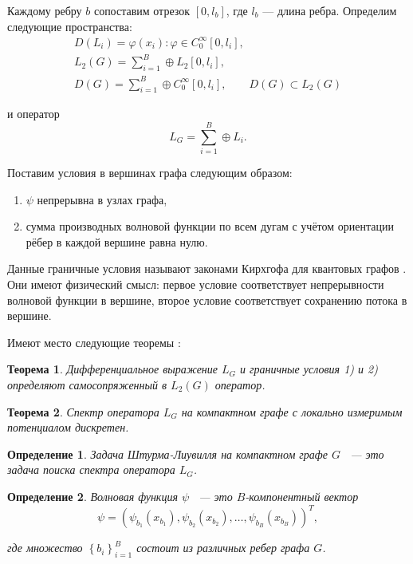 \documentclass[a4 paper, 12 pt]{extarticle}
\newtheorem{theorem}{Теорема}[section]
\newtheorem{Def}{Определение}[section]
\begin{document}
   Каждому ребру $b$ сопоставим отрезок $[0, l_b]$, где $l_b$ --- длина ребра.
   Определим следующие пространства:
   \begin{gather*}
   D(L_i)={\varphi(x_i):\varphi\in C_0^\infty[0,l_i]},\\
   L_2(G)=\sum_{i=1}^{B}\oplus L_2[0, l_i],\\
   D(G)=\sum_{i=1}^{B}\oplus C_0^\infty[0,l_i],\qquad D(G)\subset L_2(G)
  \end{gather*}

  и оператор
  \begin{equation}\label{LG}
  L_G=\sum_{i=1}^{B}\oplus L_i.
  \end{equation}

  Поставим условия в вершинах графа следующим образом:

  \begin{enumerate}\label{Kirchoff}
	\item $\psi$ непрерывна в узлах графа,
	\item сумма производных волновой функции по всем дугам с учётом ориентации рёбер в каждой вершине равна нулю.
  \end{enumerate}

  Данные граничные условия называют законами Кирхгофа для квантовых графов \cite{KirchhoffRule}. Они имеют физический смысл: первое условие соответствует непрерывности волновой функции в вершине, второе условие соответствует сохранению потока в вершине.

Имеют место следующие теоремы \cite{GerasimenkoPavlov}:

   \begin{theorem}
	Дифференциальное выражение $L_G$ и граничные условия 1) и 2)
	определяют самосопряженный в $L_2(G)$ оператор.
   \end{theorem}

  \begin{theorem}
	Спектр оператора $L_{G}$ на компактном графе с локально измеримым
	потенциалом дискретен.
  \end{theorem}

  \begin{Def}
  	Задача Штурма-Лиувилля на компактном графе $G$ ~--- это задача поиска спектра оператора $L_{G}$.
  \end{Def}

  \begin{Def}
  	Волновая функция $\psi$ ~--- это $B$-компонентный вектор $$\psi=\left(\psi_{b_1}(x_{b_1}),
  	\psi_{b_2}(x_{b_2}),\ldots,\psi_{b_B}(x_{b_B})\right)^T,$$
  	
  	где множество $\left\{b_i\right\}_{i=1}^{B}$ состоит из различных
  	ребер графа $G$.
  \end{Def}
\end{document}
